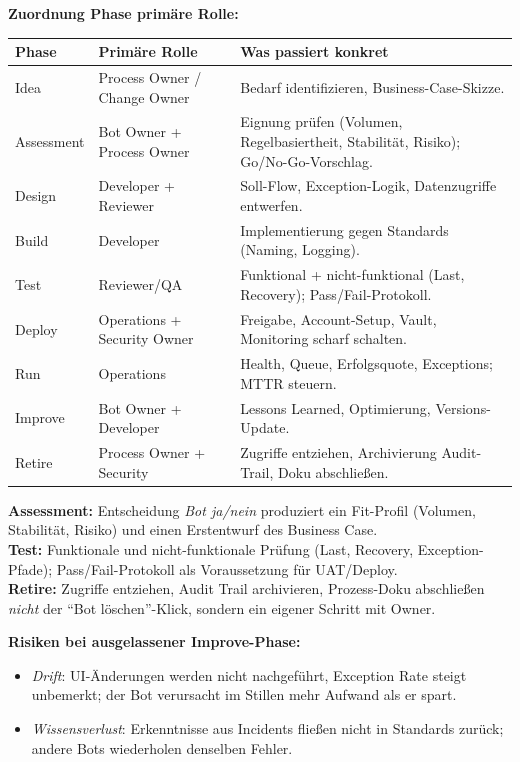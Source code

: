 \documentclass[11pt,a4paper,oneside]{article}
\begin{document}
\begin{loesungbox}
\textbf{Zuordnung Phase \textrightarrow{} prim\"are Rolle:}

\smallskip
\begin{tabularx}{\linewidth}{@{}p{3.0cm}p{4.5cm}X@{}}
\toprule
\textbf{Phase} & \textbf{Prim\"are Rolle} & \textbf{Was passiert konkret} \\
\midrule
Idea       & Process Owner / Change Owner & Bedarf identifizieren, Business-Case-Skizze. \\
Assessment & Bot Owner + Process Owner    & Eignung pr\"ufen (Volumen, Regelbasiertheit, Stabilit\"at, Risiko); Go/No-Go-Vorschlag. \\
Design     & Developer + Reviewer         & Soll-Flow, Exception-Logik, Datenzugriffe entwerfen. \\
Build      & Developer                    & Implementierung gegen Standards (Naming, Logging). \\
Test       & Reviewer/QA                  & Funktional + nicht-funktional (Last, Recovery); Pass/Fail-Protokoll. \\
Deploy     & Operations + Security Owner  & Freigabe, Account-Setup, Vault, Monitoring scharf schalten. \\
Run        & Operations                   & Health, Queue, Erfolgsquote, Exceptions; MTTR steuern. \\
Improve    & Bot Owner + Developer        & Lessons Learned, Optimierung, Versions-Update. \\
Retire     & Process Owner + Security     & Zugriffe entziehen, Archivierung Audit-Trail, Doku abschlie{\ss}en. \\
\bottomrule
\end{tabularx}

\smallskip
\textbf{Assessment:} Entscheidung \emph{Bot ja/nein} \textendash{} produziert ein Fit-Profil (Volumen, Stabilit\"at, Risiko) und einen Erstent\-wurf des Business Case.\\
\textbf{Test:} Funktionale und nicht-funktionale Pr\"ufung (Last, Recovery, Exception-Pfade); Pass/Fail-Protokoll als Voraussetzung f\"ur UAT/Deploy.\\
\textbf{Retire:} Zugriffe entziehen, Audit Trail archivieren, Prozess-Doku abschlie{\ss}en \textendash{} \emph{nicht} der ``Bot l\"oschen''-Klick, sondern ein eigener Schritt mit Owner.

\smallskip
\textbf{Risiken bei ausgelassener Improve-Phase:}
\begin{itemize}
  \item \emph{Drift}: UI-\"Anderungen werden nicht nachgef\"uhrt, Exception Rate steigt unbemerkt; der Bot verursacht im Stillen mehr Aufwand als er spart.
  \item \emph{Wissensverlust}: Erkenntnisse aus Incidents flie{\ss}en nicht in Standards zur\"uck; andere Bots wiederholen denselben Fehler.
\end{itemize}
\end{loesungbox}
\end{document}
